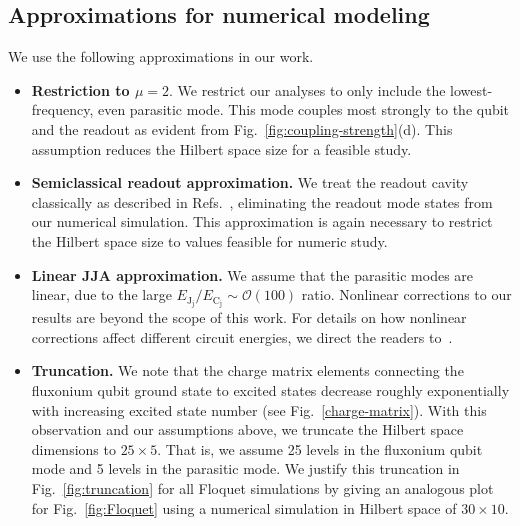 \documentclass[%
reprint,
superscriptaddress,
 amsmath,amssymb,
 aps,
 prx,
longbibliography,
floatfix,
]{revtex4-2}
\begin{document}
\subsection{Approximations for numerical modeling}\label{app:numerics}
We use the following approximations in our work.
\begin{itemize}
    \item \textbf{Restriction to $\mu=2$}. We restrict our analyses to only include the lowest-frequency, even parasitic mode. This mode couples most strongly to the qubit and the readout as evident from Fig.~\ref{fig:coupling-strength}(d). This assumption reduces the Hilbert space size for a feasible study. 

    \item \textbf{Semiclassical readout approximation.} We treat the readout cavity classically as described in Refs.~\cite{dumas2024unified,cohen2023reminiscence,khezri2023measurement}, eliminating the readout mode states from our numerical simulation. This approximation is again necessary to restrict the Hilbert space size to values feasible for numeric study.
    
    \item \textbf{Linear JJA approximation.} We assume that the parasitic modes are linear, due to the large $E_{\textrm{J}_\textrm{j}}/E_{\textrm{C}_\textrm{j}} \sim \mathcal{O}(100)$ ratio. Nonlinear corrections to our results are beyond the scope of this work. For details on how nonlinear corrections affect different circuit energies, we direct the readers to~\cite{viola2015collective}.
    
    \item \textbf{Truncation.} We note that the charge matrix elements connecting the fluxonium qubit ground state to excited states decrease roughly exponentially with increasing excited state number (see Fig.~\ref{charge-matrix}). With this observation and our assumptions above, we truncate the Hilbert space dimensions to $25\times 5$. That is, we assume 25 levels in the fluxonium qubit mode and 5 levels in the parasitic mode. We justify this truncation in Fig.~\ref{fig:truncation} for all Floquet simulations by giving an analogous plot for Fig.~\ref{fig:Floquet} using a numerical simulation in Hilbert space of $30\times 10$.
   \end{itemize}
\end{document}
